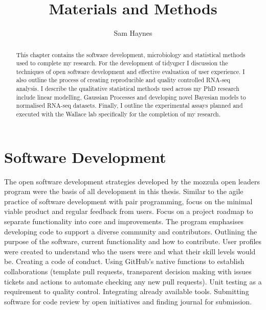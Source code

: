 \documentclass{SBCbookchapter}
\author{Sam Haynes}
\title{Materials and Methods}
\begin{document}
\maketitle

\begin{abstract}
This chapter contains the software development, microbiology and statistical methods used to complete my research. For the development of tidyqpcr I discussion the techniques of open software development and effective evaluation of user experience. I also outline the process of creating reproducible and quality controlled RNA-seq analysis. I describe the qualitative statistical methods used across my PhD research include linear modelling, Gaussian Processes and developing novel Bayesian models to normalised RNA-seq datasets. Finally, I outline the experimental assays planned and executed with the Wallace lab specifically for the completion of my research. 

\end{abstract}

\section{Software Development}

The open software development strategies developed by the mozzula open leaders program were the basis of all development in this thesis. Similar to the agile practice of software development with pair programming, focus on the minimal viable product and regular feedback from users. Focus on a project roadmap to separate functionality into core and improvements. The program emphasises developing code to support a diverse community and contributors. Outlining the purpose of the software, current functionality and how to contribute. User profiles were created to understand who the users were and what their skill levels would be. Creating a code of conduct. Using GitHub's native functions to establish collaborations (template pull requests, transparent decision making with issues tickets and actions to automate checking any new pull requests). Unit testing as a requirement to quality control. Integrating already available tools. Submitting software for code review by open initiatives and finding journal for submission.
\end{document}
